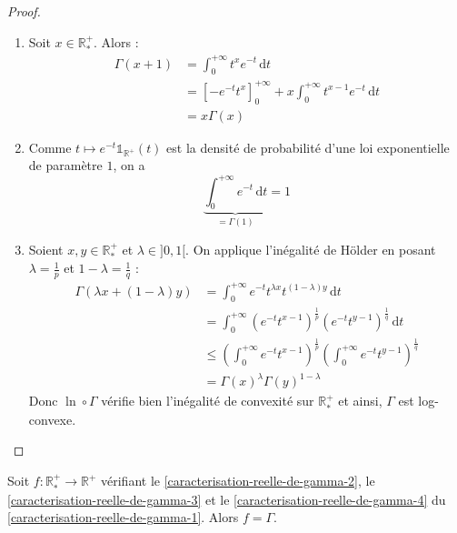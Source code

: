   \begin{proof}
    \begin{enumerate}[label=(\roman*)]
      \item Soit $x \in \mathbb{R}^+_*$. Alors :
      \begin{align*}
        \Gamma(x+1) &= \int_0^{+\infty} t^x e^{-t} \, \mathrm{d}t \\
        &= \left[ -e^{-t} t^x \right]_0^{+\infty} + x \int_0^{+\infty} t^{x-1} e^{-t} \, \mathrm{d}t \\
        &= x\Gamma(x)
      \end{align*}
      \item Comme $t \mapsto e^{-t} \mathbb{1}_{\mathbb{R}^+}(t)$ est la densité de probabilité d'une loi exponentielle de paramètre $1$, on a
      \[ \underbrace{\int_0^{+\infty} e^{-t} \, \mathrm{d}t}_{= \Gamma(1)} = 1 \]
      \item Soient $x, y \in \mathbb{R}^+_*$ et $\lambda \in ]0, 1[$. On applique l'inégalité de Hölder en posant $\lambda = \frac{1}{p}$ et $1-\lambda = \frac{1}{q}$ :
      \begin{align*}
        \Gamma(\lambda x + (1-\lambda) y) &= \int_0^{+\infty} e^{-t} t^{\lambda x} t^{(1-\lambda)y} \, \mathrm{d}t \\
        &= \int_0^{+\infty} (e^{-t} t^{x-1})^{\frac{1}{p}} (e^{-t} t^{y-1})^{\frac{1}{q}} \, \mathrm{d}t \\
        &\leq \left (\int_0^{+\infty} e^{-t} t^{x-1} \right)^{\frac{1}{p}} \left (\int_0^{+\infty} e^{-t} t^{y-1} \right)^{\frac{1}{q}} \\
        &= \Gamma(x)^\lambda \Gamma(y)^{1-\lambda}
      \end{align*}
      Donc $\ln \circ \Gamma$ vérifie bien l'inégalité de convexité sur $\mathbb{R}^+_*$ et ainsi, $\Gamma$ est log-convexe.
    \end{enumerate}
  \end{proof}

  \begin{exercice}
    Soit $f : \mathbb{R}^+_* \rightarrow \mathbb{R}^+$ vérifiant le \cref{caracterisation-reelle-de-gamma-2}, le \cref{caracterisation-reelle-de-gamma-3} et le \cref{caracterisation-reelle-de-gamma-4} du \cref{caracterisation-reelle-de-gamma-1}. Alors $f = \Gamma$.
  \end{exercice}

